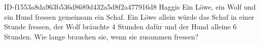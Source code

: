\begin{exercise}
      {ID-f1553a8da963b536d8689d432a5d8f2a477916d8}
      {Haggis}
  \ifproblem\problem
    Ein Löwe, ein Wolf und ein Hund fressen gemeinsam ein Schaf. Ein Löwe allein
    würde das Schaf in einer Stunde fressen, der Wolf bräuchte 4 Stunden dafür
    und der Hund alleine 6 Stunden. Wie lange brauchen sie, wenn sie zusammen
    fressen?
  \fi
\end{exercise}
